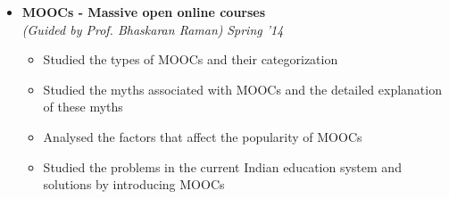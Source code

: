 \begin{itemize}
\item \textbf{MOOCs - Massive open online courses}  \\
      \emph{(Guided by Prof. Bhaskaran Raman)} \hfill {\emph{Spring '14}} \\[-0.6cm]
      \begin{itemize}
	    \item Studied the types of MOOCs and their categorization \\[-0.5cm]
	    \item Studied the myths associated with MOOCs and the detailed explanation of these myths \\[-0.5cm]
	    \item Analysed the factors that affect the popularity of MOOCs \\[-0.5cm]
	    \item Studied the problems in the current Indian education system and solutions by introducing MOOCs \\[-0.4cm]
      \end{itemize}
\end{itemize}

